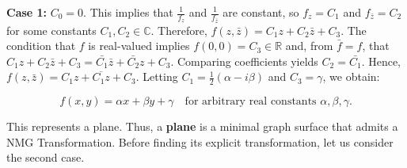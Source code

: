 \documentclass[12pt]{article}
\theoremstyle{plain}
\theoremstyle{definition}
\theoremstyle{remark}
\begin{document}
   \textbf{Case 1: } \(C_0 = 0\). This implies that \(\frac{1}{f_z}\) and \(\frac{1}{f_{\bar{z}}}\) are constant, so \(f_z = C_1\) and \(f_{\bar{z}} = C_2\) for some constants \(C_1, C_2 \in \mathbb{C}\). Therefore, \(f(z, \bar{z}) = C_1 z + C_2 \bar{z} + C_3\). The condition that \(f\) is real-valued implies \(f(0,0) = C_3 \in \mathbb{R}\) and, from \(\bar{f} = f\), that \(C_1 z + C_2 \bar{z} + C_3 = \bar{C_1} \bar{z} + \bar{C_2} z + C_3\). Comparing coefficients yields \(C_2 = \bar{C_1}\). Hence, \(f(z, \bar{z}) = C_1 z + \overline{C_1 z} + C_3\). Letting \(C_1 = \tfrac{1}{2}(\alpha - i\beta)\) and \(C_3 = \gamma\), we obtain:
   
   \begin{equation}
   	\label{eqn: case h=0 Plane}
   	\boxed{f(x,y) = \alpha x + \beta y + \gamma} \quad \text{for arbitrary real constants } \alpha, \beta, \gamma.
   \end{equation}
   
   This represents a plane. Thus, a \textbf{plane} is a minimal graph surface that admits a NMG Transformation. Before finding its explicit transformation, let us consider the second case.
   
\end{document}
